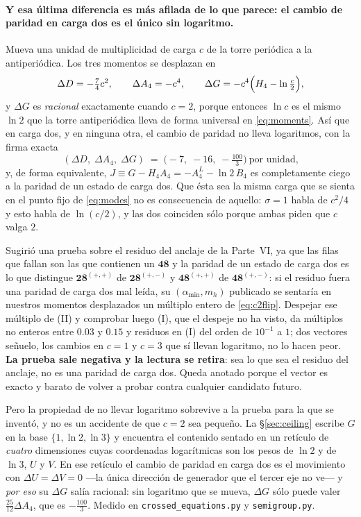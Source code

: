 \documentclass[11pt,a4paper]{article}
\newcommand{\rep}[1]{\mathbf{#1}}
\newcommand{\amin}{\alpha_{\min}}
\begin{document}
\paragraph{Y esa última diferencia es más afilada de lo que parece: el cambio de paridad en
carga dos es el único sin logaritmo.} Mueva una
unidad de multiplicidad de carga $c$ de la torre periódica a la antiperiódica. Los tres momentos se
desplazan en
\[
  \Delta D=-\tfrac74c^2,\qquad \Delta A_4=-c^4,\qquad
  \Delta G=-c^4\Bigl(H_4-\ln\tfrac{c}{2}\Bigr),
\]
y $\Delta G$ es \emph{racional} exactamente cuando $c=2$, porque entonces $\ln c$ es el mismo $\ln2$
que la torre antiperiódica lleva de forma universal en \eqref{eq:moments}. Así que en carga dos, y en
ninguna otra, el cambio de paridad no lleva logaritmos, con la firma exacta
\begin{equation}\label{eq:c2flip}
  (\Delta D,\;\Delta A_4,\;\Delta G)\;=\;\bigl(-7,\;-16,\;-\tfrac{100}{3}\bigr)\ \text{por unidad,}
\end{equation}
y, de forma equivalente, $J\equiv G-H_4A_4=-A_4^{L}-\ln2\,B_4$ es completamente ciego a la paridad
de un estado de carga dos. Que ésta sea la misma carga que se sienta en el punto fijo de
\eqref{eq:modes} no es consecuencia de aquello: $\sigma=1$ habla de $c^2/4$ y esto habla de
$\ln(c/2)$, y las dos coinciden sólo porque ambas piden que $c$ valga $2$.

Sugirió una prueba sobre el residuo del anclaje de la Parte~VI, ya que las filas que fallan son las
que contienen un $\rep{48}$ y la paridad de un estado de carga dos es lo que distingue
$\rep{28}^{(+,+)}$ de $\rep{28}^{(+,-)}$ y $\rep{48}^{(+,+)}$ de $\rep{48}^{(+,-)}$: si el residuo
fuera una paridad de carga dos mal leída, su $(\amin,m_h)$ publicado se sentaría en nuestros momentos
desplazados un múltiplo entero de \eqref{eq:c2flip}. Despejar ese múltiplo de (II) y comprobar luego
(I), que el despeje no ha visto, da múltiplos no enteros entre $0.03$ y $0.15$ y residuos en (I) del
orden de $10^{-1}$ a $1$; dos vectores señuelo, los cambios en $c=1$ y $c=3$ que sí llevan
logaritmo, no lo hacen peor. \textbf{La prueba sale negativa y la lectura se retira}: sea lo que sea
el residuo del anclaje, no es una paridad de carga dos. Queda anotado porque el vector es exacto y
barato de volver a probar contra cualquier candidato futuro.

Pero la propiedad de no llevar logaritmo sobrevive a la prueba para la que se inventó, y no es un
accidente de que $c=2$ sea pequeño. La \S\ref{sec:ceiling} escribe $G$ en la base
$\{1,\ln2,\ln3\}$ y encuentra el contenido sentado en un retículo de \emph{cuatro} dimensiones
cuyas coordenadas logarítmicas son los pesos de $\ln2$ y de $\ln3$, $U$ y $V$. En ese retículo el
cambio de paridad en carga dos es el movimiento con $\Delta U=\Delta V=0$ ---la única dirección de
generador que el tercer eje no ve--- y \emph{por eso} su $\Delta G$ salía racional: sin logaritmo
que se mueva, $\Delta G$ sólo puede valer $\tfrac{25}{12}\Delta A_4$, que es $-\tfrac{100}{3}$.
Medido en \texttt{crossed\_\allowbreak equations.py} y \texttt{semigroup.py}.
\end{document}
